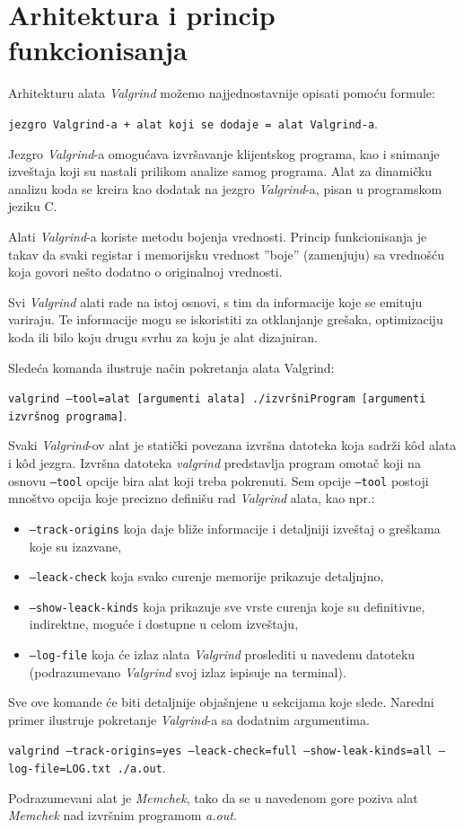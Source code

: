 \documentclass[12pt,oneside]{memoir}
\theoremstyle{plain}
\theoremstyle{definition}
\begin{document}
\section{Arhitektura i princip funkcionisanja}
Arhitekturu alata \textit{Valgrind} možemo najjednostavnije opisati pomoću formule:
\begin{center}
\texttt{jezgro Valgrind-a + alat koji se dodaje = alat Valgrind-a}.
\end{center}

Jezgro \textit{Valgrind}-a omogućava izvršavanje klijentskog programa, kao i snimanje izveštaja koji su nastali prilikom analize samog programa. Alat za dinamičku analizu koda se kreira kao dodatak na jezgro \textit{Valgrind}-a, pisan u programskom jeziku C.

Alati \textit{Valgrind}-a koriste metodu bojenja vrednosti. Princip funkcionisanja je takav da svaki registar i memorijsku vrednost ''boje'' (zamenjuju) sa vrednošću koja govori nešto dodatno o originalnoj vrednosti.

Svi \textit{Valgrind} alati rade na istoj osnovi, s tim da informacije koje se emituju variraju. Te informacije mogu se iskoristiti za otklanjanje grešaka, optimizaciju koda ili bilo koju drugu svrhu za koju je alat dizajniran.

Sledeća komanda ilustruje način pokretanja alata Valgrind:
\begin{center}
\texttt{valgrind --tool=alat [argumenti alata] ./izvršniProgram [argumenti izvršnog programa]}.
\end{center}

Svaki \textit{Valgrind}-ov alat je statički povezana izvršna datoteka koja sadrži k\^od alata i k\^od jezgra. Izvršna datoteka \textit{valgrind} predstavlja program omotač koji na osnovu \texttt{--tool} opcije bira alat koji treba pokrenuti. Sem opcije \texttt{--tool} postoji mnoštvo opcija koje precizno definišu rad \textit{Valgrind} alata, kao npr.:
\begin{itemize}
\item \texttt{--track-origins} koja daje bliže informacije i detaljniji izveštaj o greškama koje su izazvane, 
\item \texttt{--leack-check} koja svako curenje memorije prikazuje detaljnjno,
\item \texttt{--show-leack-kinds} koja prikazuje sve vrste curenja koje su definitivne, indirektne, moguće i dostupne u celom izveštaju,
\item \texttt{--log-file}  koja će izlaz alata \textit{Valgrind} proslediti u navedenu datoteku (podrazumevano \textit{Valgrind} svoj izlaz ispisuje na terminal).
\end{itemize} 
Sve ove komande će biti detaljnije objašnjene u sekcijama koje slede. Naredni primer ilustruje pokretanje \textit{Valgrind}-a sa dodatnim argumentima.
\begin{center}
\texttt{valgrind --track-origins=yes --leack-check=full --show-leak-kinds=all --log-file=LOG.txt ./a.out}.
\end{center}
Podrazumevani alat je \textit{Memchek}, tako da se u navedenom gore poziva alat \textit{Memchek} nad izvršnim programom \textit{a.out}.
\end{document}
